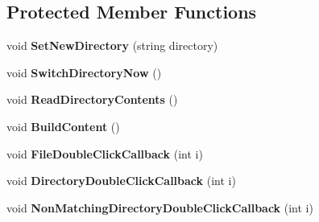 \subsection*{Protected Member Functions}
\begin{DoxyCompactItemize}
\item 
\mbox{\label{class_lerp2_a_p_i_1_1_utility_1_1_file_browser_aa68ea9e64f15e83b27bf80764bffd73e}} 
void {\bfseries Set\+New\+Directory} (string directory)
\item 
\mbox{\label{class_lerp2_a_p_i_1_1_utility_1_1_file_browser_afe7a058a57d0d5cd2d23a4c8627f8d47}} 
void {\bfseries Switch\+Directory\+Now} ()
\item 
\mbox{\label{class_lerp2_a_p_i_1_1_utility_1_1_file_browser_a99457ee3afa64b50cd3f4268635714fd}} 
void {\bfseries Read\+Directory\+Contents} ()
\item 
\mbox{\label{class_lerp2_a_p_i_1_1_utility_1_1_file_browser_aa21e664f5caf0c8a84ec02063b97b19c}} 
void {\bfseries Build\+Content} ()
\item 
\mbox{\label{class_lerp2_a_p_i_1_1_utility_1_1_file_browser_a8e7fc16e34dbdd6af88edc59fcafbee1}} 
void {\bfseries File\+Double\+Click\+Callback} (int i)
\item 
\mbox{\label{class_lerp2_a_p_i_1_1_utility_1_1_file_browser_a2e2843c8a971885de886d78a470a120b}} 
void {\bfseries Directory\+Double\+Click\+Callback} (int i)
\item 
\mbox{\label{class_lerp2_a_p_i_1_1_utility_1_1_file_browser_ae12ef8d957873b57b6d93b6139607a2e}} 
void {\bfseries Non\+Matching\+Directory\+Double\+Click\+Callback} (int i)
\end{DoxyCompactItemize}
